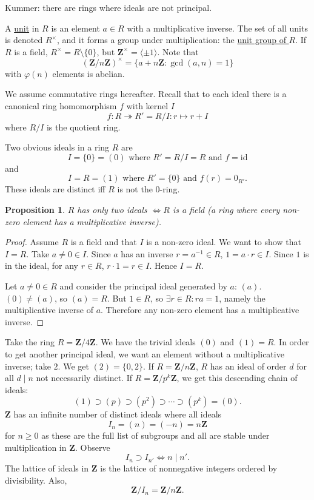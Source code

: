 \documentclass[11pt, oneside]{amsart}
\numberwithin{equation}{section}
\numberwithin{theorem}{section}
\newtheorem{proposition}[theorem]{Proposition}
\theoremstyle{definition}
\def\Z{\mathbf{Z}}
\begin{document}
{Kummer: there are rings where ideals are not principal. 

A \underline{unit} in $R$ is an element $a\in R$ with a multiplicative inverse. The set of all units is denoted $R^\times$, and it forms a group under multiplication: the \underline{unit group of $R$}. If $R$ is a field, $R^\times =  R \setminus \{0\}$, but $\Z^\times = \langle \pm 1\rangle$. Note that
$$
(\Z/n\Z)^\times = \{a+n\Z : \gcd(a,n) = 1\}
$$ 
with $\varphi (n)$ elements is abelian. 

We assume commutative rings hereafter. Recall that to each ideal there is a canonical ring homomorphism $f$ with kernel $I$
$$
f : R\twoheadrightarrow R' = R/I : r\mapsto r + I
$$ 
where $R/I$ is the quotient ring. 

Two obvious ideals in a ring $R$ are 
$$
I = \{0\} = (0) \textrm{  where  } R' = R/I = R \textrm{  and  } f = \mathrm{id}
$$
and
$$
I = R = (1) \textrm{  where  } R' = \{0\}\textrm{  and  } f(r) = 0_{R'}.
$$
These ideals are distinct iff $R$ is not the $0$-ring.
\begin{proposition}
$R$ has only two ideals $\iff R$ is a field (a ring where every non-zero element has a multiplicative inverse).
\end{proposition}
\begin{proof}
Assume $R$ is a field and that $I$ is a non-zero ideal. We want to show that $I=R$. Take $a\neq 0\in I$. Since $a$ has an inverse $r=a^{-1}\in R$, $1=a\cdot r\in I$. Since $1$ is in the ideal, for any $r\in R$, $r\cdot 1 = r\in I$. Hence $I=R$. 

Let $a\neq 0\in R$ and consider the principal ideal generated by $a$: $(a)$. $(0) \neq (a)$, so $(a)=R$. But $1\in R$, so $\exists r\in R: ra=1$, namely the multiplicative inverse of $a$. Therefore any non-zero element has a multiplicative inverse. 
\end{proof}

Take the ring $R = \Z/4\Z$. We have the trivial ideals $(0)$ and $(1) = R$. In order to get another principal ideal, we want an element without a multiplicative inverse; take $2$. We get $(2) = \{0,2\}$. If $R=\Z/n\Z$, $R$ has an ideal of order $d$ for all $d\mid n$ not necessarily distinct. If $R=\Z/p^k\Z$, we get this descending chain of ideals:
$$
(1) \supset (p) \supset (p^2) \supset \cdots\supset (p^k) = (0).
$$
$\Z$ has an infinite number of distinct ideals where all ideals
$$
I_n = (n) = (-n) = n\Z
$$
for $n\geqslant 0$ as these are the full list of subgroups and all are stable under multiplication in $\Z$. Observe 
$$
I_n \supset I_{n'} \iff n \mid n'.
$$
The lattice of ideals in $\Z$ is the lattice of nonnegative integers ordered by divisibility. Also,
$$
\Z/I_n = \Z/n\Z.
$$

}
\end{document}
